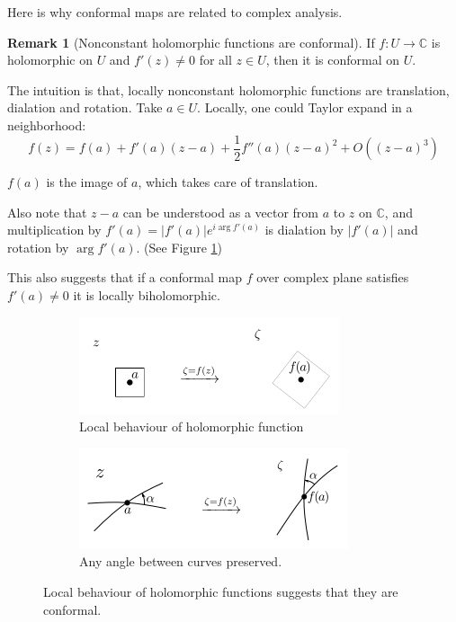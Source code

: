 \documentclass[a4paper, 12pt]{article}
\theoremstyle{definition}
\newtheorem{remark}{Remark}
\numberwithin{theorem}{section}
\numberwithin{definition}{section}
\numberwithin{exercise}{section}
\numberwithin{remark}{section}
\numberwithin{figure}{section}
\numberwithin{example}{section}
\newcommand{\C}{\mathbb{C}}
\begin{document}
Here is why conformal maps are related to complex analysis.
\begin{remark}[Nonconstant holomorphic functions are conformal]
    If $f:U \rightarrow \C$ is holomorphic on $U$ and $f'(z) \neq 0$ for all $z \in U$, then it is conformal on $U$.

    The intuition is that, locally nonconstant holomorphic functions are translation, dialation and rotation.
    Take $a \in U$.
    Locally, one could Taylor expand in a neighborhood:
    \begin{equation*}
        f(z) = f(a) + f'(a)(z-a) + \frac{1}{2}f''(a) \left( z-a \right)^2 + O \left( \left( z-a \right)^3 \right)
    \end{equation*}

    $f(a)$ is the image of $a$, which takes care of translation.

    Also note that $z-a$ can be understood as a vector from $a$ to $z$ on $\C$,
    and multiplication by $f'(a) = |f'(a)| e^{i \arg f'(a)}$ is dialation by $|f'(a)|$ and rotation by $\arg f'(a)$.
    (See Figure \ref{fig: Local Conformal Map})

    This also suggests that if a conformal map $f$ over complex plane satisfies $f'(a) \neq 0$
    it is locally biholomorphic.

    \begin{figure}[tbp]
        \centering
        \begin{subfigure}[b]{0.5\textwidth}
            \centering
            \includegraphics[width=\textwidth]{LocalConformal1}
            \caption{Local behaviour of holomorphic function}
        \end{subfigure}
        \hfill
        \begin{subfigure}[b]{0.5\textwidth}
            \centering
            \includegraphics[width=\textwidth]{LocalConformal2}
            \caption{Any angle between curves preserved.}
        \end{subfigure}
        \caption{Local behaviour of holomorphic functions suggests that they are conformal.}
        \label{fig: Local Conformal Map}
    \end{figure}
\end{remark}
\end{document}
